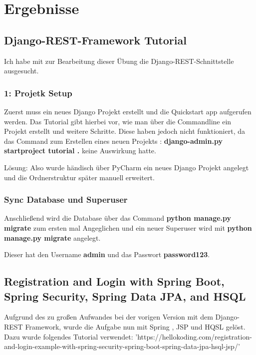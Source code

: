 
\section{Ergebnisse}
\label{sec:Ergebnisse}

\subsection{Django-REST-Framework Tutorial}
Ich habe mit zur Bearbeitung dieser Übung die Django-REST-Schnittstelle ausgesucht.

\subsubsection{1: Projetk Setup}
Zuerst muss ein neues Django Projekt erstellt und die Quickstart app aufgerufen werden.
Das Tutorial gibt hierbei vor, wie man über die Commandline ein Projekt erstellt und weitere Schritte. Diese haben jedoch nicht funktioniert, da das Command zum Erstellen eines neuen Projekts : \textbf{django-admin.py startproject tutorial .} keine Auswirkung hatte.

Lösung: Also wurde händisch über PyCharm ein neues Django Projekt angelegt und die Ordnerstruktur später manuell erweitert.

\subsubsection{Sync Database und Superuser}

Anschließend wird die Database über das Command \textbf{python manage.py migrate} zum ersten mal Angeglichen und ein neuer Superuser wird mit \textbf{python manage.py migrate} angelegt.

Dieser hat den Username \textbf{admin} und das Passwort \textbf{password123}.

  
  
\subsection{Registration and Login with Spring Boot, Spring Security, Spring Data JPA, and HSQL}

Aufgrund des zu großen Aufwandes bei der vorigen Version mit dem Django-REST Framework, wurde die Aufgabe nun mit Spring , JSP und HQSL gelöst. Dazu wurde folgendes Tutorial verwendet: 'https://hellokoding.com/registration-and-login-example-with-spring-security-spring-boot-spring-data-jpa-hsql-jsp/'


